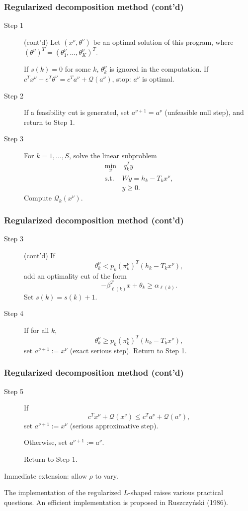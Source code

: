 \documentclass{beamer}
\begin{document}
\begin{frame}
\frametitle{Regularized decomposition method (cont'd)}

\begin{description}
\item[Step 1] (cont'd)
Let $(x^{\nu}, \theta^{\nu})$ be an optimal solution of this program, where $(\theta^{\nu})^T = (\theta^{\nu}_1,\ldots,\theta^{\nu}_K)^T$.

If $s(k) = 0$ for some $k$, $\theta_k^{\nu}$ is ignored in the computation.
If $c^Tx^{\nu} + e^T\theta^{\nu} = c^Ta^{\nu} + \mathcal{Q}(a^{\nu})$, stop: $a^{\nu}$ is optimal.
\item[Step 2]
If a feasibility cut is generated, set $a^{\nu+1} = a^{\nu}$
(unfeasible null step), and return to Step 1.
\item[Step 3]
For $k = 1,\ldots,S$, solve the linear subproblem
\begin{align*}
\min_y &\ q_k^Ty \\
\mbox{s.t. } & Wy = h_k - T_kx^{\nu}, \\
& y \geq 0.
\end{align*}
Compute $\mathcal{Q}_k(x^{\nu})$.
\end{description}

\end{frame}

\begin{frame}
\frametitle{Regularized decomposition method (cont'd)}

\begin{description}
\item[Step 3] (cont'd) If
\[
\theta_k^{\nu} < p_k (\pi_k^{\nu})^T(h_k - T_kx^{\nu}),
\]
add an optimality cut of the form
\[
-\beta^T_{\ell(k)} x + \theta_k \geq \alpha_{\ell(k)}.
\]
Set $s(k) = s(k)+1$.
\item[Step 4] If for all $k$,
\[
\theta_k^{\nu} \geq p_k (\pi_k^{\nu})^T(h_k - T_kx^{\nu}),
\]
set $a^{\nu+1} := x^{\nu}$ (exact serious step). Return to Step 1.
\end{description}

\end{frame}

\begin{frame}
\frametitle{Regularized decomposition method (cont'd)}

\begin{description}
\item[Step 5] If
\[
c^Tx^{\nu} + \mathcal{Q}(x^{\nu}) \leq c^Ta^{\nu} + \mathcal{Q}(a^{\nu}),
\]
set $a^{\nu+1} := x^{\nu}$ (serious approximative step).

Otherwise, set $a^{\nu+1} := a^{\nu}$.

Return to Step 1.
\end{description}

\mbox{}

{\blue Immediate extension}: allow $\rho$ to vary.

\mbox{}

The implementation of the regularized $L$-shaped raises various practical questions.
An efficient implementation is proposed in Ruszczy\'nski (1986).
\end{frame}
\end{document}
